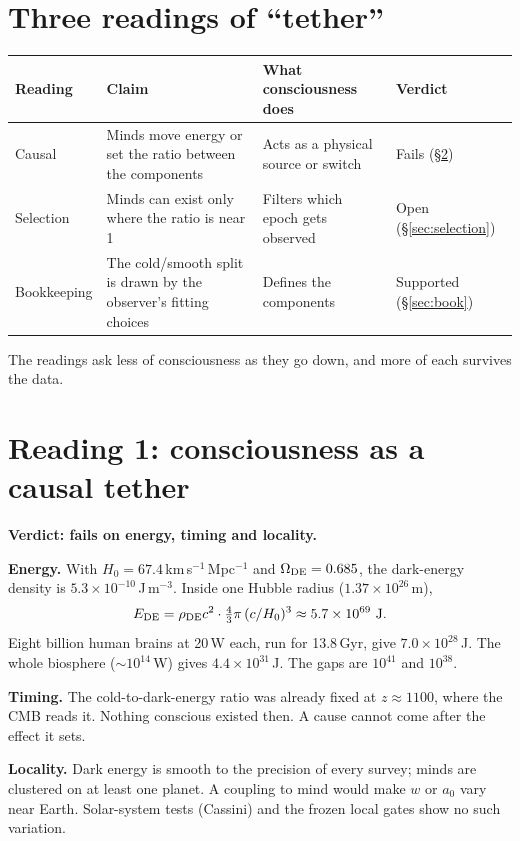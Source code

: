 \documentclass[10pt]{article}
\begin{document}
\section{Three readings of ``tether''}
\begin{center}
\begin{tabularx}{\linewidth}{@{}l X X l@{}}
\toprule
Reading & Claim & What consciousness does & Verdict\\
\midrule
Causal & Minds move energy or set the ratio between the components & Acts as a physical source or switch & Fails (\S\ref{sec:causal})\\
Selection & Minds can exist only where the ratio is near 1 & Filters which epoch gets observed & Open (\S\ref{sec:selection})\\
Bookkeeping & The cold/smooth split is drawn by the observer's fitting choices & Defines the components & Supported (\S\ref{sec:book})\\
\bottomrule
\end{tabularx}
\end{center}
The readings ask less of consciousness as they go down, and more of each survives the data.

\section{Reading 1: consciousness as a causal tether}\label{sec:causal}
\textbf{Verdict: fails on energy, timing and locality.}

\textbf{Energy.} With $H_0=67.4$\,km\,s$^{-1}$\,Mpc$^{-1}$ and $\Omega_{\rm DE}=0.685$, the dark-energy density is $5.3\times10^{-10}$\,J\,m$^{-3}$. Inside one Hubble radius ($1.37\times10^{26}$\,m),
\begin{equation}
E_{\rm DE}=\rho_{\rm DE}c^2\cdot\tfrac43\pi\,(c/H_0)^3\approx5.7\times10^{69}\ {\rm J}.
\end{equation}
Eight billion human brains at 20\,W each, run for 13.8\,Gyr, give $7.0\times10^{28}$\,J. The whole biosphere ($\sim10^{14}$\,W) gives $4.4\times10^{31}$\,J. The gaps are $10^{41}$ and $10^{38}$.

\textbf{Timing.} The cold-to-dark-energy ratio was already fixed at $z\approx1100$, where the CMB reads it. Nothing conscious existed then. A cause cannot come after the effect it sets.

\textbf{Locality.} Dark energy is smooth to the precision of every survey; minds are clustered on at least one planet. A coupling to mind would make $w$ or $a_0$ vary near Earth. Solar-system tests (Cassini) and the frozen local gates show no such variation.
\end{document}
